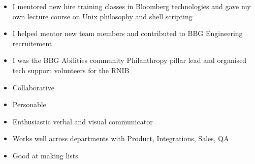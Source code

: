 %
%
%

\twocolumnsection
{
\vspace{0.15em}
\begin{itemize}
	\item I mentored new hire training classes in Bloomberg technologies and gave my own lecture course on Unix philosophy and shell scripting
    \item I helped mentor new team members and contributed to BBG Engineering recruitement
    \item I was the BBG Abilities community Philanthropy pillar lead and organised tech support volunteers for the RNIB
\end{itemize}
}
{
\vspace{0.25em}
\begin{itemize}
	\item Collaborative
	\item Personable
    \item Enthusiastic verbal and visual communicator
    \item Works well across departments with Product, Integrations, Sales, QA
    \item Good at making lists
\end{itemize}
}


